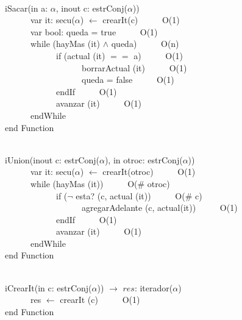 \documentclass[a4paper,10pt]{article}
\begin{document}
\begin{algoritmo}
\caption{}\\
  iSacar(in a: $\alpha$, inout c: estrConj($\alpha$))\\
	\indent \ \ \ \ \ \  var it: secu($\alpha$) $\gets$ crearIt(c)  \ \ \ \ \ O(1)\\
	\indent \ \ \ \ \ \  var bool: queda = true \ \ \ \ \ O(1)\\
	\indent \ \ \ \ \ \  while (hayMas (it) $\wedge$ queda) \ \ \ \ \ O(n)\\
	\indent \ \ \ \ \ \ \ \ \ \ \ \  if (actual (it) $==$ a)  \ \ \ \ \ O(1)\\
	\indent \ \ \ \ \ \ \ \ \ \ \ \ \ \ \ \ \ \ borrarActual (it)  \ \ \ \ \ O(1)\\
	\indent \ \ \ \ \ \ \ \ \ \ \ \ \ \ \ \ \ \ queda = false  \ \ \ \ \ O(1)\\
	\indent \ \ \ \ \ \ \ \ \ \ \ \  endIf \ \ \ \ \ O(1)\\
	\indent \ \ \ \ \ \ \ \ \ \ \ \  avanzar (it) \ \ \ \ \ O(1)\\
	\indent \ \ \ \ \ \ endWhile \ \ \ \ \ \\
   end Function 
\end{algoritmo}

\begin{algoritmo}
\caption{}\\
  iUnion(inout c: estrConj($\alpha$), in otroc: estrConj($\alpha$))\\
	\indent \ \ \ \ \ \  var it: secu($\alpha$) $\gets$ crearIt(otroc)  \ \ \ \ \ O(1)\\
	\indent \ \ \ \ \ \  while (hayMas (it)) \ \ \ \ \ O(\# otroc)\\
	\indent \ \ \ \ \ \ \ \ \ \ \ \  if ($\neg$ esta? (c, actual (it))  \ \ \ \ \ O(\# c)\\
	\indent \ \ \ \ \ \ \ \ \ \ \ \ \ \ \ \ \ \ agregarAdelante (c, actual(it))  \ \ \ \ \ O(1)\\
	\indent \ \ \ \ \ \ \ \ \ \ \ \  endIf \ \ \ \ \ O(1)\\
	\indent \ \ \ \ \ \ \ \ \ \ \ \  avanzar (it) \ \ \ \ \ O(1)\\
	\indent \ \ \ \ \ \ endWhile \ \ \ \ \ \\
   end Function 
\end{algoritmo}

\begin{algoritmo}
\caption{}\\
  iCrearIt(in c: estrConj($\alpha$)) $\rightarrow$ $res$: iterador($\alpha$) \\
	\indent \ \ \ \ \ \  res $\gets$ crearIt (c)  \ \ \ \ \ O(1)\\
   end Function 
\end{algoritmo}
\end{document}
